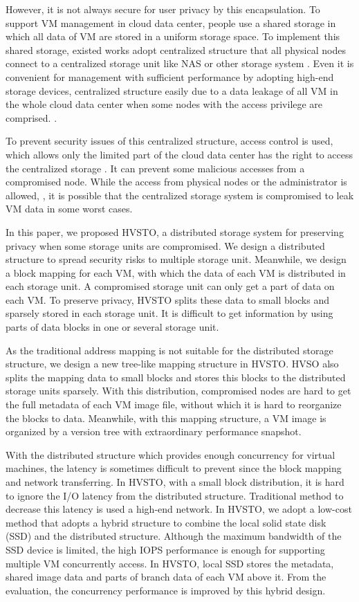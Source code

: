\documentclass[conference]{IEEEtran}
\begin{document}
However, it is not always secure for user privacy by this encapsulation. To support VM management in cloud data center, people use a shared storage in which all data of VM are stored in a uniform storage space. To implement this shared storage, existed works adopt centralized structure that all physical nodes connect to a centralized storage unit like NAS or other storage system  \cite{Vaghani2010}. Even it is convenient for management with sufficient performance by adopting high-end storage devices, centralized structure easily due to a data leakage of all VM in the whole cloud data center when some nodes with the access privilege are comprised. \cite{itani2009}.

To prevent security issues of this centralized structure, access control is used, which allows only the limited part of the cloud data center has the right to access the centralized storage \cite{Wei2009b}. It can prevent some malicious accesses from a compromised node. While the access from physical nodes or the administrator is allowed,  , it is possible that the centralized storage system is compromised to leak VM data in some worst cases.

In this paper, we proposed HVSTO, a distributed storage system for preserving privacy when some storage units are compromised. We design a distributed structure to spread security risks to multiple storage unit. Meanwhile, we design a block mapping for each VM, with which the data of each VM is distributed in each storage unit. A compromised storage unit can only get a part of data on each VM. To preserve privacy, HVSTO splits these data to small blocks and sparsely stored in each storage unit. It is difficult to get information by using parts of data blocks in one or several storage unit.

As the traditional address mapping is not suitable for the distributed storage structure, we design a new tree-like mapping structure in HVSTO. HVSO also splits the mapping data to small blocks and stores this blocks to the distributed storage units sparsely. With this distribution, compromised nodes are hard to get the full metadata of each VM image file, without which it is hard to reorganize the blocks to data. Meanwhile, with this mapping structure, a VM image is organized by a version tree with extraordinary performance snapshot.





With the distributed structure which provides enough concurrency for virtual machines, the latency is sometimes difficult to prevent since the block mapping and network transferring. In HVSTO, with a small block distribution, it is hard to ignore the I/O latency from the distributed structure. Traditional method to decrease this latency is used a high-end network. In HVSTO, we adopt a low-cost method that adopts a hybrid structure to combine the local solid state disk (SSD) and the distributed structure. Although the maximum bandwidth of the SSD device is limited, the high IOPS performance is enough for supporting multiple VM concurrently access. In HVSTO, local SSD stores the metadata, shared image data and parts of branch data of each VM above it. From the evaluation, the concurrency performance is improved by this hybrid design.
\end{document}
